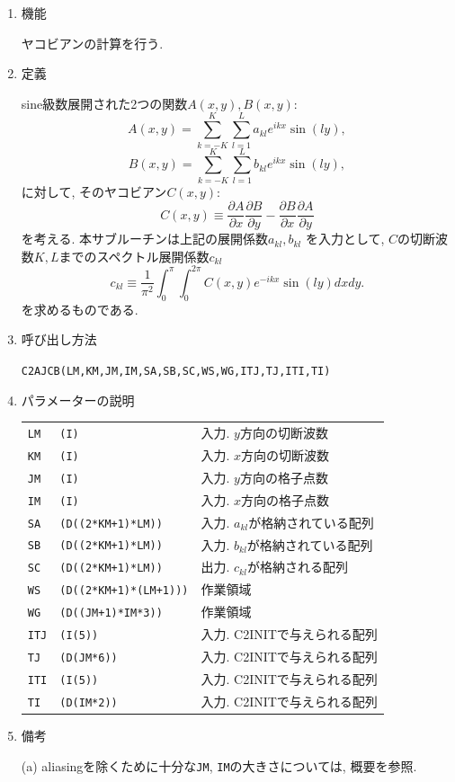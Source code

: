 \documentclass[a4j,fleqn]{jarticle}
\begin{document}
\begin{enumerate}

\item 機能 

ヤコビアンの計算を行う.

\item 定義

sine級数展開された2つの関数$A(x,y),B(x,y)$:
\[
A(x,y)=\sum^K_{k=-K}\sum^L_{l=1}a_{kl}e^{ikx}\sin(ly),
\]
\[
B(x,y)=\sum^K_{k=-K}\sum^L_{l=1}b_{kl}e^{ikx}\sin(ly),
\]
に対して, そのヤコビアン$C(x,y)$:
\[
C(x,y)\equiv
\frac{\partial A}{\partial x}\frac{\partial B}{\partial y}
-\frac{\partial B}{\partial x}\frac{\partial A}{\partial y}
\]
を考える. 本サブルーチンは上記の展開係数$a_{kl},b_{kl}$
を入力として,
$C$の切断波数$K,L$までのスペクトル展開係数$c_{kl}$
\begin{equation}
c_{kl}\equiv\frac1{\pi^2}\int^{\pi}_0\int^{2\pi}_0
C(x,y)e^{-ikx}\sin(ly)dxdy.
\end{equation}
を求めるものである. 

\item 呼び出し方法 

{\tt C2AJCB(LM,KM,JM,IM,SA,SB,SC,WS,WG,ITJ,TJ,ITI,TI)}
  
\item パラメーターの説明

\begin{tabular}{lll}
{\tt LM} & {\tt (I)} & 入力. $y$方向の切断波数\\
{\tt KM} & {\tt (I)} & 入力. $x$方向の切断波数\\
{\tt JM} & {\tt (I)} & 入力. $y$方向の格子点数\\
{\tt IM} & {\tt (I)} & 入力. $x$方向の格子点数\\
{\tt SA} & {\tt (D((2*KM+1)*LM))} & 入力. $a_{kl}$が格納されている配列\\
{\tt SB} & {\tt (D((2*KM+1)*LM))} & 入力. $b_{kl}$が格納されている配列\\
{\tt SC} & {\tt (D((2*KM+1)*LM))} & 出力. $c_{kl}$が格納される配列\\
{\tt WS} & {\tt (D((2*KM+1)*(LM+1)))} & 作業領域\\
{\tt WG} & {\tt (D((JM+1)*IM*3))} & 作業領域\\
{\tt ITJ} & {\tt (I(5))} & 入力. C2INITで与えられる配列\\
{\tt TJ} & {\tt (D(JM*6))} & 入力. C2INITで与えられる配列\\
{\tt ITI} & {\tt (I(5))} & 入力. C2INITで与えられる配列\\
{\tt TI} & {\tt (D(IM*2))} & 入力. C2INITで与えられる配列
\end{tabular}

\item 備考

(a) aliasingを除くために十分な{\tt JM}, {\tt IM}の大きさについては, 
概要を参照.

\end{enumerate}
\end{document}

